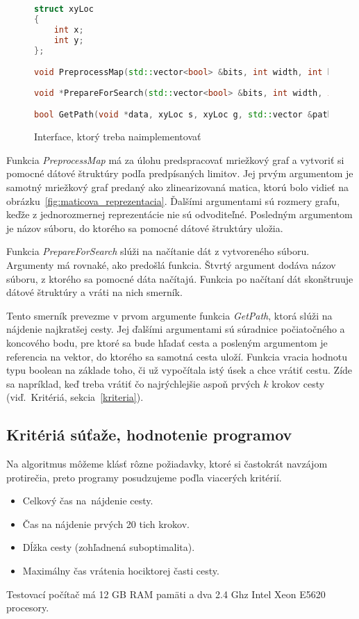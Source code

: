 \begin{figure}
\begin{lstlisting}[language=C++]
struct xyLoc 
{
    int x;
    int y;
};

void PreprocessMap(std::vector<bool> &bits, int width, int height, const char *filename);
                   
void *PrepareForSearch(std::vector<bool> &bits, int width, int height,const char *filename);

bool GetPath(void *data, xyLoc s, xyLoc g, std::vector &path);
\end{lstlisting}
\caption{Interface, ktorý treba naimplementovať}
\label{fig:interface}
\end{figure}
Funkcia \emph{PreprocessMap} má za úlohu predspracovať
mriežkový graf a vytvoriť si pomocné dátové štruktúry podľa predpísaných limitov. Jej prvým argumentom 
je samotný mriežkový graf predaný ako zlinearizovaná matica, ktorú bolo vidieť na obrázku~\ref{fig:maticova_reprezentacia}. Ďalšími argumentami sú rozmery grafu,
keďže z jednorozmernej reprezentácie nie sú odvoditeľné. Posledným argumentom je názov súboru, do ktorého sa pomocné dátové štruktúry uložia.

Funkcia \emph{PrepareForSearch} slúži na načítanie dát z vytvoreného súboru. Argumenty má rovnaké, ako predošlá funkcia. Štvrtý argument
dodáva názov súboru, z ktorého sa pomocné dáta načítajú. Funkcia po načítaní dát skonštruuje dátové štruktúry a vráti na nich smerník.

Tento smerník prevezme v prvom argumente funkcia \emph{GetPath}, ktorá slúži na nájdenie najkratšej cesty. Jej ďalšími argumentami
sú súradnice počiatočného a koncového bodu, pre ktoré sa bude hľadať cesta a posleným argumentom je referencia na vektor, do ktorého sa samotná cesta uloží. Funkcia vracia hodnotu typu boolean na základe toho, či už vypočítala istý úsek a chce vrátiť cestu. Zíde sa napríklad, keď treba vrátiť čo najrýchlejšie aspoň prvých $k$ krokov cesty (viď.~Kritériá, sekcia~\ref{kriteria}).



\subsection{Kritériá súťaže, hodnotenie programov}
Na algoritmus môžeme klásť rôzne požiadavky, ktoré si častokrát navzájom protirečia, preto programy posudzujeme poďla viacerých kritérií.
\label{kriteria}
\begin{itemize}
\item Celkový čas na~nájdenie cesty.
\item Čas na nájdenie prvých 20 tich krokov.
\item Dĺžka cesty (zohľadnená suboptimalita).
\item Maximálny čas vrátenia hociktorej časti cesty.
\end{itemize}

Testovací počítač má 12 GB RAM pamäti a dva 2.4 Ghz Intel Xeon E5620
procesory.